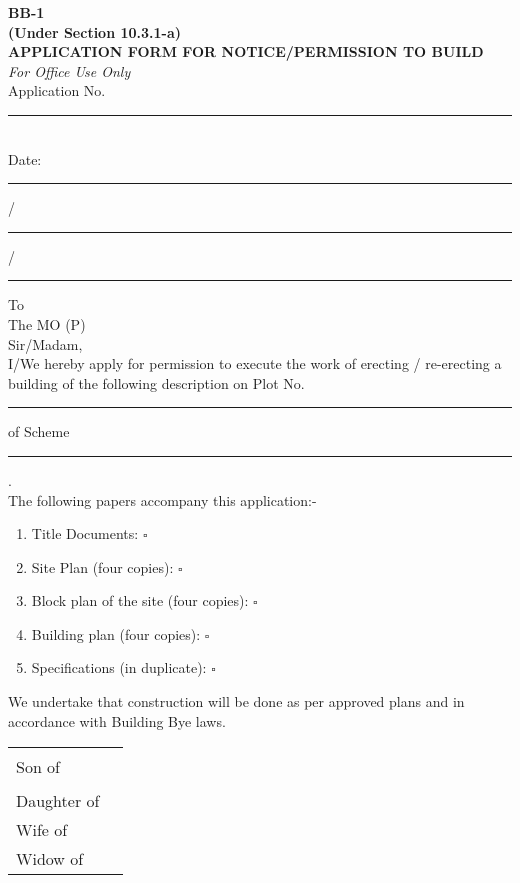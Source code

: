 \documentclass{article}
\begin{document}
\begin{center}
\textbf{BB-1} \\
\textbf{(Under Section 10.3.1-a)} \\
\textbf{APPLICATION FORM FOR NOTICE/PERMISSION TO BUILD} \\
\textit{For Office Use Only} \\
Application No. \rule{5cm}{0.15mm} \\
Date: \rule{0.5cm}{0.15mm} / \rule{0.5cm}{0.15mm} / \rule{0.5cm}{0.15mm}
\end{center}

To \\
The MO (P) \\
Sir/Madam, \\

I/We hereby apply for permission to execute the work of erecting / re-erecting a building of the following description on Plot No. \rule{5cm}{0.15mm} of Scheme \rule{5cm}{0.15mm}. \\

The following papers accompany this application:- \\
\begin{enumerate}
    \item Title Documents: \hfill \hspace{1cm} $\square$
    \item Site Plan (four copies): \hfill \hspace{1cm} $\square$
    \item Block plan of the site (four copies): \hfill \hspace{1cm} $\square$
    \item Building plan (four copies): \hfill \hspace{1cm} $\square$
    \item Specifications (in duplicate): \hfill \hspace{1cm} $\square$
\end{enumerate}

We undertake that construction will be done as per approved plans and in accordance with Building Bye laws. \\

\begin{tabular}{|l|l|}
\hline
Son of & \rule{8cm}{0.15mm} \\
Daughter of & \\
Wife of & \\
Widow of & \\
\hline
\end{tabular}
\end{document}
